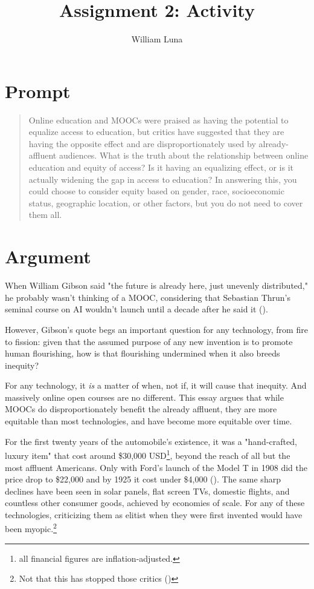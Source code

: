 \documentclass[
	letterpaper, %
]{jdf}
\author{William Luna}
\title{Assignment 2: Activity}
\begin{document}
\newcommand{\pcite}[1]{(\cite{#1})}

\maketitle

\section{Prompt} 

\blockquote{Online education and MOOCs were praised as having the potential to equalize access to education, but critics have suggested that they are having the opposite effect and are disproportionately used by already-affluent audiences. What is the truth about the relationship between online education and equity of access? Is it having an equalizing effect, or is it actually widening the gap in access to education? In answering this, you could choose to consider equity based on gender, race, socioeconomic status, geographic location, or other factors, but you do not need to cover them all.}

\section{Argument}

When William Gibson said "the future is already here, just unevenly distributed," he probably wasn't thinking of a MOOC, considering that Sebastian Thrun's seminal course on AI wouldn't launch until a decade after he said it \pcite{gibson, Thrun2012}.

However, Gibson's quote begs an important question for any technology, from fire to fission: given that the assumed purpose of any new invention is to promote human flourishing, how is that flourishing undermined when it also breeds inequity?

For any technology, it \textit{is} a matter of when, not if, it will cause that inequity. And massively online open courses are no different. This essay argues that while MOOCs do disproportionately benefit the already affluent, they are more equitable than most technologies, and have become more equitable over time.

For the first twenty years of the automobile's existence, it was a "hand-crafted, luxury item" that cost around \$30,000 USD\footnote{all financial figures are inflation-adjusted.}, beyond the reach of all but the most affluent Americans. Only with Ford's launch of the Model T in 1908 did the price drop to \$22,000 and by 1925 it cost under \$4,000 \pcite{ford}. The same sharp declines have been seen in solar panels, flat screen TVs, domestic flights, and countless other consumer goods, achieved by economies of scale. For any of these technologies, criticizing them as elitist when they were first invented would have been myopic.\footnote{Not that this has stopped those critics \pcite{StanfordSolarPanels2022}}
\end{document}
